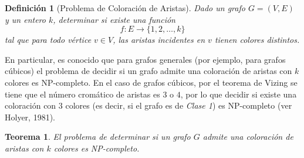 \documentclass[a4paper]{article}
\newtheorem{theorem}{Teorema}
\newtheorem{definition}{Definición}
\begin{document}
\begin{definition}[Problema de Coloración de Aristas]
Dado un grafo $G=(V,E)$ y un entero $k$, determinar si existe una función
\[
f : E \to \{1,2,\dots,k\}
\]
tal que para todo vértice $v\in V$, las aristas incidentes en $v$ tienen colores distintos.
\end{definition}

En particular, es conocido que para grafos generales (por ejemplo, para grafos cúbicos) el problema de decidir si un grafo admite una coloración de aristas con $k$ colores es NP-completo. En el caso de grafos cúbicos, por el teorema de Vizing se tiene que el número cromático de aristas es $3$ o $4$, por lo que decidir si existe una coloración con $3$ colores (es decir, si el grafo es de \emph{Clase 1}) es NP-completo (ver Holyer, 1981).

\begin{theorem}
El problema de determinar si un grafo $G$ admite una coloración de aristas con $k$ colores es NP-completo.
\end{theorem}
\end{document}
